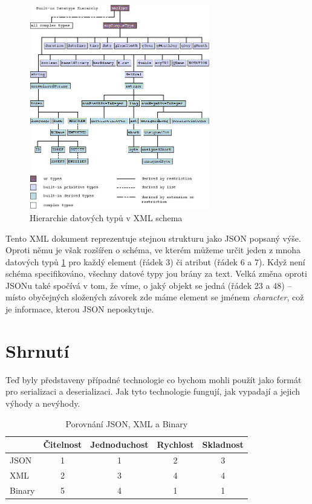 \begin{figure}[H]
  \centering
  \includegraphics[width=0.7\textwidth]{figures/type-hierarchy.png}
  \caption{Hierarchie datových typů v XML schema}%
  \label{fig:xml_datatypes}
\end{figure}


Tento XML dokument reprezentuje stejnou strukturu jako JSON popsaný výše. Oproti němu je však rozšířen o schéma, ve kterém můžeme určit jeden z mnoha datových typů \ref{fig:xml_datatypes} pro každý element (řádek 3) či atribut (řádek 6 a 7). Když není schéma specifikováno, všechny datové typy jou brány za text. Velká změna oproti JSONu také spočívá v tom, že víme, o jaký objekt se jedná (řádek 23 a 48) -- místo obyčejných složených závorek zde máme element se jménem \textit{character}, což je informace, kterou JSON neposkytuje.


\section{Shrnutí}
Teď byly představeny případné technologie co bychom mohli použít jako formát pro serializaci a deserializaci. Jak tyto technologie fungují, jak vypadají a jejich výhody a nevýhody.

\begin{table}[h]
  \centering
  \begin{tabular}{|l|c|c|c|c|}
    \hline
           & Čitelnost & Jednoduchost & Rychlost & Skladnost \\
    \hline
    JSON   & 1         & 1            & 2        & 3         \\
    \hline
    XML    & 2         & 3            & 4        & 4         \\
    \hline
    Binary & 5         & 4            & 1        & 1         \\
    \hline
  \end{tabular}
  \caption{Porovnání JSON, XML a Binary }
  \label{tab:formats_comparison}
\end{table}

